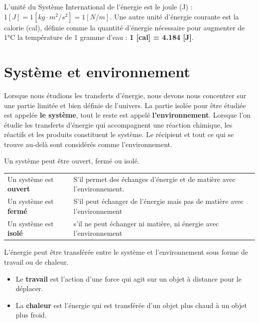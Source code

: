 \documentclass[
  11pt,
  a4paper,
  openany]{book}
\providecommand{\tightlist}{%
  \setlength{\itemsep}{0pt}\setlength{\parskip}{0pt}}
\begin{document}
L'unité du Système International de l'énergie est le joule (J) : \(1 [J] = 1 [kg \cdot m^2 / s^2] = 1 [N/m]\). Une autre unité d'énergie courante est la calorie (cal), définie comme la quantité d'énergie nécessaire pour augmenter de 1°C la température de 1 gramme d'eau : \textbf{1 {[}cal{]} = 4.184 {[}J{]}}.

\section{Système et environnement}\label{systuxe8me-et-environnement}

Lorsque nous étudions les transferts d'énergie, nous devons nous concentrer sur une partie limitée et bien définie de l'univers. La partie isolée pour être étudiée est appelée \textbf{le système}, tout le reste est appelé \textbf{l'environnement}. Lorsque l'on étudie les transferts d'énergie qui accompagnent une réaction chimique, les réactifs et les produits constituent le système. Le récipient et tout ce qui se trouve au-delà sont considérés comme l'environnement.

Un système peut être ouvert, fermé ou isolé.

\begin{longtable}[]{@{}
  >{\raggedright\arraybackslash}p{}
  >{\raggedright\arraybackslash}p{}@{}}
\toprule\noalign{}
\endhead
\bottomrule\noalign{}
\endlastfoot
Un système est \textbf{ouvert} & S'il permet des échanges d'énergie et de matière avec l'environnement. \\
Un système est \textbf{fermé} & S'il peut échanger de l'énergie mais pas de matière avec l'environnement \\
Un système est \textbf{isolé} & s'il ne peut échanger ni matière, ni énergie avec l'environnement \\
\end{longtable}

L'énergie peut être transférée entre le système et l'environnement sous forme de travail ou de chaleur.

\begin{itemize}
\tightlist
\item
  Le \textbf{travail} est l'action d'une force qui agit sur un objet à distance pour le déplacer.
\item
  La \textbf{chaleur} est l'énergie qui est transférée d'un objet plus chaud à un objet plus froid.
\end{itemize}
\end{document}
